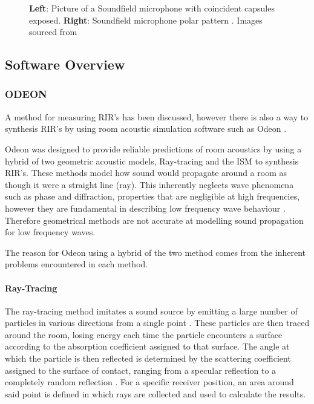 \documentclass[../../main.tex]{subfiles}
\begin{document}
\begin{figure}[ht]
\begin{minipage}{0.5\textwidth}
				\end{minipage}
				\caption{\textbf{Left}: Picture of a Soundfield microphone with coincident capsules exposed. \textbf{Right}: Soundfield microphone polar pattern \cite{soundFieldMic}. Images sourced from~\cite{ambisonics}}
				\label{sfMic}
			\end{figure}

		\subsection{Software Overview}

		\subsubsection{ODEON}
		\label{Software:Odeon}
		A method for measuring \ac{RIR}'s has been discussed, however there is also a way to synthesis \ac{RIR}'s by using room acoustic simulation software such as Odeon \cite{odeon}.

			Odeon was designed to provide reliable predictions of room acoustics by using a hybrid of two geometric acoustic models, Ray-tracing and the \ac{ISM} to synthesis \ac{RIR}'s. These methods model how sound would propagate around a room as though it were a straight line (ray). This inherently neglects wave phenomena such as phase and diffraction, properties that are negligible at high frequencies, however they are fundamental in describing low frequency wave behaviour \cite{Siltanen2010}. Therefore geometrical methods are not accurate at modelling sound propagation for low frequency waves.

			The reason for Odeon using a hybrid of the two method comes from the inherent problems encountered in each method.

		\paragraph{Ray-Tracing}
			The ray-tracing method imitates a sound source by emitting a large number of particles in various directions from a single point \cite{Rindel1995}. These particles are then traced around the room, losing energy each time the particle encounters a surface according to the absorption coefficient assigned to that surface. The angle at which the particle is then reflected is determined by the scattering coefficient assigned to the surface of contact, ranging from a specular reflection to a completely random reflection \cite{odeonManual}. For a specific receiver position, an area around said point is defined in which rays are collected and used to calculate the results.
\end{document}
